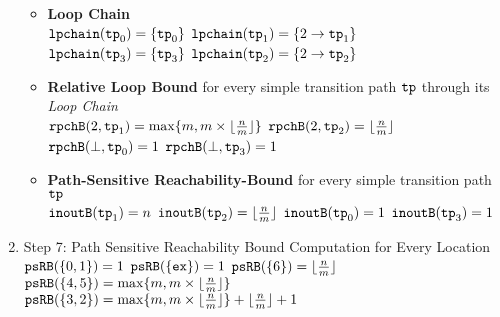 \begin{enumerate}
\begin{itemize}
  \item \textbf{Loop Chain}
  \\
  $\mathtt{lpchain}(\mathtt{tp}_0) = \{\mathtt{tp}_0\}$ \qquad
  $\mathtt{lpchain}(\mathtt{tp}_1) = \{2\to \mathtt{tp}_1\}$ \\
  $\mathtt{lpchain}(\mathtt{tp}_3) = \{\mathtt{tp}_3\}$ \qquad
  $\mathtt{lpchain}(\mathtt{tp}_2) = \{2\to \mathtt{tp}_2\}$ 
  \item \textbf{{Relative Loop Bound}} for every simple transition path $\mathtt{tp}$ through its \emph{Loop Chain}
  \\
  $\mathtt{rpchB}(2, \mathtt{tp}_1) = \max\{m, m \times \lfloor\frac{n}{m}\rfloor\}$ \quad
  $\mathtt{rpchB}(2, \mathtt{tp}_2) = \lfloor\frac{n}{m}\rfloor$  \\
  $\mathtt{rpchB}(\bot, \mathtt{tp}_0) = 1$ \quad
  $\mathtt{rpchB}(\bot, \mathtt{tp}_3) = 1$ 
  \item \textbf{Path-Sensitive Reachability-Bound} for every simple transition path $\mathtt{tp}$
  \\
  $\mathtt{inoutB}(\mathtt{tp}_1) = n$ \quad
  $\mathtt{inoutB}(\mathtt{tp}_2) = \lfloor\frac{n}{m}\rfloor$ \quad
  $\mathtt{inoutB}(\mathtt{tp}_0) = 1$ \quad
  $\mathtt{inoutB}(\mathtt{tp}_3) = 1$ 
\end{itemize}
\item Step 7: Path Sensitive Reachability Bound Computation for Every Location
\\
$\mathtt{psRB}(\{0, 1\}) = 1$ \qquad
$\mathtt{psRB}(\{\mathtt{ex}\}) = 1$ \qquad
$\mathtt{psRB}(\{6 \}) = \lfloor\frac{n}{m}\rfloor$ \\
$\mathtt{psRB}(\{4, 5 \}) = \max\{m, m \times \lfloor\frac{n}{m}\rfloor\}$ \quad
$\mathtt{psRB}(\{3, 2 \}) = \max\{m, m \times \lfloor\frac{n}{m}\rfloor\} + \lfloor\frac{n}{m}\rfloor + 1 $ \\
\end{enumerate}